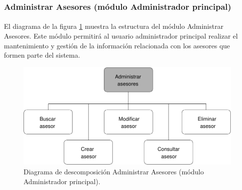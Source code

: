 \subsubsection{Administrar Asesores (módulo Administrador principal)}

  \paragraph{}El diagrama de la figura
  \ref{diagramaDescomposicionAdministrarAsesores} muestra la estructura del
  módulo Administrar Asesores. Este módulo permitirá al usuario administrador
  principal realizar el mantenimiento y gestión de la información relacionada
  con los asesores que formen parte del sistema.

  \begin{figure}[!ht]
    \begin{center}
      \includegraphics[]{11.Disenyo_Arquitectonico/11.2.Diagramas_Descomposicion/11.2.2.Modulo_administrador_principal/AdministrarBBDD/AdministrarUsuarios/AdministrarAsesores/Diagramas/administrar_asesores.pdf}
      \caption{Diagrama de descomposición Administrar Asesores (módulo Administrador principal).}
      \label{diagramaDescomposicionAdministrarAsesores}
    \end{center}
  \end{figure}

